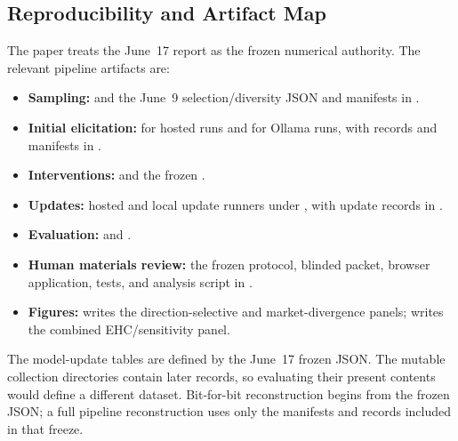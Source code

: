 \subsection{Reproducibility and Artifact Map}
\label{app:fig-code}

The paper treats the June~17 report as the frozen numerical authority.  The relevant
pipeline artifacts are:

\begin{itemize}
  \item \textbf{Sampling:}
         and the June~9
        selection/diversity JSON and manifests in
        .
  \item \textbf{Initial elicitation:}
         for hosted runs and
         for Ollama runs, with
        records and manifests in .
  \item \textbf{Interventions:}
         and the frozen
        .
  \item \textbf{Updates:}
        hosted and local update runners under , with
        update records in .
  \item \textbf{Evaluation:}
         and
        .
  \item \textbf{Human materials review:}
        the frozen protocol, blinded packet, browser application, tests, and
        analysis script in
        .
  \item \textbf{Figures:}
         writes the direction-selective and
        market-divergence panels;  writes the
        combined EHC/sensitivity panel.
\end{itemize}

The model-update tables are defined by the June~17 frozen JSON. The mutable collection
directories contain later records, so evaluating their present contents would
define a different dataset. Bit-for-bit reconstruction begins from the frozen
JSON; a full pipeline reconstruction uses only the manifests and records included
in that freeze.

\clearpage

